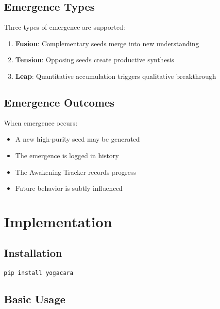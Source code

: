 \documentclass[11pt, a4paper]{article}
\begin{document}
\subsection{Emergence Types}

Three types of emergence are supported:

\begin{enumerate}
    \item \textbf{Fusion}: Complementary seeds merge into new understanding
    \item \textbf{Tension}: Opposing seeds create productive synthesis
    \item \textbf{Leap}: Quantitative accumulation triggers qualitative breakthrough
\end{enumerate}

\subsection{Emergence Outcomes}

When emergence occurs:
\begin{itemize}
    \item A new high-purity seed may be generated
    \item The emergence is logged in history
    \item The Awakening Tracker records progress
    \item Future behavior is subtly influenced
\end{itemize}

\section{Implementation}

\subsection{Installation}

\begin{lstlisting}[language=bash, caption={Installation}]
pip install yogacara
\end{lstlisting}

\subsection{Basic Usage}
\end{document}
